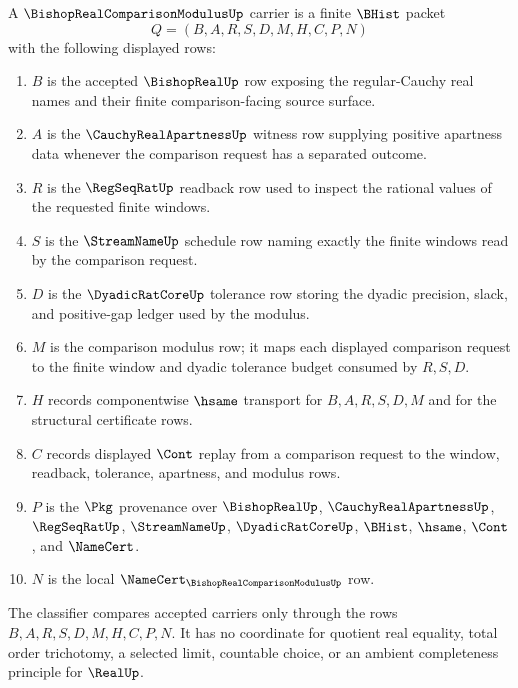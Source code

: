 \begin{definition}
\label{def:bishop-real-comparison-modulus-carrier}
A $\BishopRealComparisonModulusUp$ carrier is a finite $\BHist$ packet
$$
Q=(B,A,R,S,D,M,H,C,P,N)
$$
with the following displayed rows:
\begin{enumerate}
\item $B$ is the accepted $\BishopRealUp$ row exposing the regular-Cauchy real names and their finite comparison-facing source surface.
\item $A$ is the $\CauchyRealApartnessUp$ witness row supplying positive apartness data whenever the comparison request has a separated outcome.
\item $R$ is the $\RegSeqRatUp$ readback row used to inspect the rational values of the requested finite windows.
\item $S$ is the $\StreamNameUp$ schedule row naming exactly the finite windows read by the comparison request.
\item $D$ is the $\DyadicRatCoreUp$ tolerance row storing the dyadic precision, slack, and positive-gap ledger used by the modulus.
\item $M$ is the comparison modulus row; it maps each displayed comparison request to the finite window and dyadic tolerance budget consumed by $R,S,D$.
\item $H$ records componentwise $\hsame$ transport for $B,A,R,S,D,M$ and for the structural certificate rows.
\item $C$ records displayed $\Cont$ replay from a comparison request to the window, readback, tolerance, apartness, and modulus rows.
\item $P$ is the $\Pkg$ provenance over $\BishopRealUp$, $\CauchyRealApartnessUp$, $\RegSeqRatUp$, $\StreamNameUp$, $\DyadicRatCoreUp$, $\BHist$, $\hsame$, $\Cont$, and $\NameCert$.
\item $N$ is the local $\NameCert_{\BishopRealComparisonModulusUp}$ row.
\end{enumerate}
The classifier compares accepted carriers only through the rows $B,A,R,S,D,M,H,C,P,N$. It has no coordinate for quotient real equality, total order trichotomy, a selected limit, countable choice, or an ambient completeness principle for $\RealUp$.
\end{definition}

